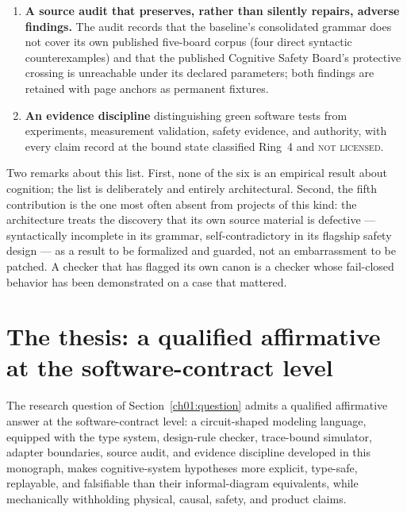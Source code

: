 \begin{enumerate}
\item \textbf{A source audit that preserves, rather than silently repairs,
adverse findings.} The audit records that the baseline's consolidated
grammar does not cover its own published five-board corpus (four direct
syntactic counterexamples) and that the published Cognitive Safety Board's
protective crossing is unreachable under its declared parameters; both
findings are retained with page anchors as permanent fixtures.

\item \textbf{An evidence discipline} distinguishing green software tests
from experiments, measurement validation, safety evidence, and authority,
with every claim record at the bound state classified Ring~4 and
\textsc{not licensed}.
\end{enumerate}

Two remarks about this list. First, none of the six is an empirical result
about cognition; the list is deliberately and entirely architectural.
Second, the fifth contribution is the one most often absent from projects of
this kind: the architecture treats the
discovery that its own source material is defective --- syntactically
incomplete in its grammar, self-contradictory in its flagship safety design
--- as a result to be formalized and guarded, not an embarrassment to be
patched. A checker that has flagged its own canon is a checker whose
fail-closed behavior has been demonstrated on a case that mattered.

\section{The thesis: a qualified affirmative at the software-contract level}\label{ch01:thesis}

\begin{hypothesis}\label{ch01:hyp:thesis}
The research question of Section~\ref{ch01:question} admits a qualified
affirmative answer at the software-contract level: a circuit-shaped modeling
language, equipped with the type system, design-rule checker, trace-bound
simulator, adapter boundaries, source audit, and evidence discipline
developed in this monograph, makes cognitive-system hypotheses more explicit,
type-safe, replayable, and falsifiable than their informal-diagram
equivalents, while mechanically withholding physical, causal, safety, and
product claims.
\end{hypothesis}

